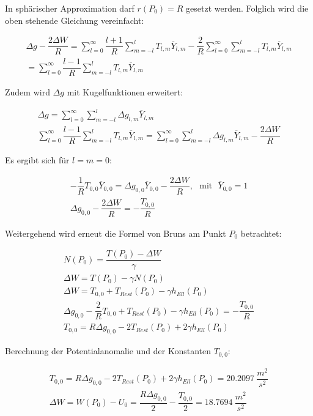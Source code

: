 \begin{enumerate}[a)]
In sphärischer Approximation darf $r(P_0)=R$ gesetzt werden. Folglich wird die oben stehende Gleichung vereinfacht: 

\begin{gather*}
\Delta g - \dfrac{2 \Delta W}{R} = \sum_{l=0}^{\infty} \dfrac{l+1}{R} \sum_{m=-l}^{l} T_{l,m} \overline{Y}_{l,m} - \dfrac{2}{R} \sum_{l=0}^{\infty} \sum_{m=-l}^{l} T_{l,m} \overline{Y}_{l,m} \\
= \sum_{l=0}^{\infty} \dfrac{l-1}{R} \sum_{m=-l}^{l} T_{l,m} \overline{Y}_{l,m}
\end{gather*}

Zudem wird $\Delta g$ mit Kugelfunktionen erweitert: 

\begin{gather*}
\Delta g = \sum_{l=0}^{\infty} \sum_{m=-l}^{l} \Delta g_{l,m} \overline{Y}_{l,m} \\
\sum_{l=0}^{\infty} \dfrac{l-1}{R} \sum_{m=-l}^{l} T_{l,m} \overline{Y}_{l,m} = \sum_{l=0}^{\infty} \sum_{m=-l}^{l} \Delta g_{l,m} \overline{Y}_{l,m} - \dfrac{2 \Delta W}{R}
\end{gather*}

Es ergibt sich für $l=m=0$: 

\begin{gather*}
- \dfrac{1}{R} T_{0,0} \overline{Y}_{0,0} = \Delta g_{0,0} \overline{Y}_{0,0} - \dfrac{2 \Delta W}{R}, ~~~ \text{mit} ~~~ \overline{Y}_{0,0} = 1 \\
\Delta g_{0,0} - \dfrac{2 \Delta W}{R} = - \dfrac{T_{0,0}}{R} 
\end{gather*}

Weitergehend wird erneut die Formel von Bruns am Punkt $P_0$ betrachtet: 

\begin{gather*}
N(P_0) = \dfrac{T(P_0) - \Delta W}{\gamma} \\
\Delta W = T(P_0) - \gamma N(P_0) \\ 
\Delta W = T_{0,0} + T_{Rest}(P_0) - \gamma h_{Ell}(P_0) \\
\Delta g_{0,0} - \dfrac{2}{R} T_{0,0} + T_{Rest}(P_0) - \gamma h_{Ell}(P_0) = - \dfrac{T_{0,0}}{R} \\
T_{0,0} = R \Delta g_{0,0} - 2 T_{Rest}(P_0) + 2 \gamma h_{Ell}(P_0)
\end{gather*}

Berechnung der Potentialanomalie und der Konstanten $T_{0,0}$: 

\begin{gather*}
T_{0,0} = R \Delta g_{0,0} - 2 T_{Rest}(P_0) + 2 \gamma h_{Ell}(P_0) = 20.2097~\dfrac{m^2}{s^2} \\
\Delta W = W(P_0) - U_0 = \dfrac{R \Delta g_{0,0}}{2} - \dfrac{T_{0,0}}{2} = 18.7694~\dfrac{m^2}{s^2}
\end{gather*}


\end{enumerate}
